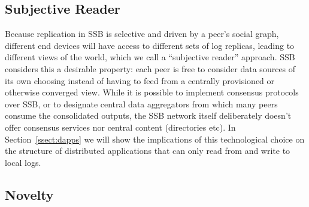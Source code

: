 \documentclass[9pt,sigconf]{acmart}
\begin{document}
\subsection*{Subjective Reader}

Because replication in SSB is selective and driven by a peer's
social graph, different end devices will have access to different sets
of log replicas, leading to different views of the world, which we call
a ``subjective reader'' approach. SSB considers this a desirable
property: each peer is free to
consider data sources of its own choosing instead of having to feed
from a centrally provisioned or otherwise converged view. While it is
possible to implement consensus protocols over SSB, or to designate
central data aggregators from which many peers consume the
consolidated outputs, the SSB network itself deliberately doesn't
offer consensus services nor central content (directories etc). In
Section~\ref{ssect:dapps} we will show the implications of this
technological choice on the structure of distributed applications that
can only read from and write to local logs.

\subsection*{Novelty}
\end{document}
